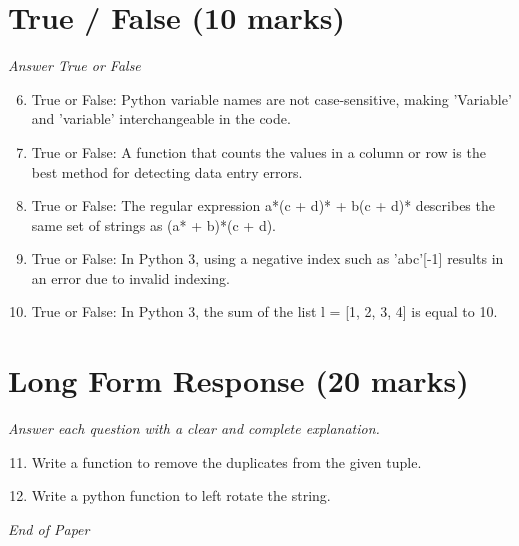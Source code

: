 \documentclass[12pt]{article}
\begin{document}
\section*{True / False (10 marks)}
\textit{Answer True or False}
\begin{enumerate}[label=\arabic*.]
\setcounter{enumi}{5}
\item True or False: Python variable names are not case-sensitive, making 'Variable' and 'variable' interchangeable in the code.
\item True or False: A function that counts the values in a column or row is the best method for detecting data entry errors.
\item True or False: The regular expression a*(c + d)* + b(c + d)* describes the same set of strings as (a* + b)*(c + d).
\item True or False: In Python 3, using a negative index such as 'abc'[-1] results in an error due to invalid indexing.
\item True or False: In Python 3, the sum of the list l = [1, 2, 3, 4] is equal to 10.
\end{enumerate}

\section*{Long Form Response (20 marks)}
\textit{Answer each question with a clear and complete explanation.}
\begin{enumerate}[label=\arabic*.]
\setcounter{enumi}{10}
\item Write a function to remove the duplicates from the given tuple.
\item Write a python function to left rotate the string.
\end{enumerate}

\vfill
\noindent\textit{End of Paper}
\end{document}
